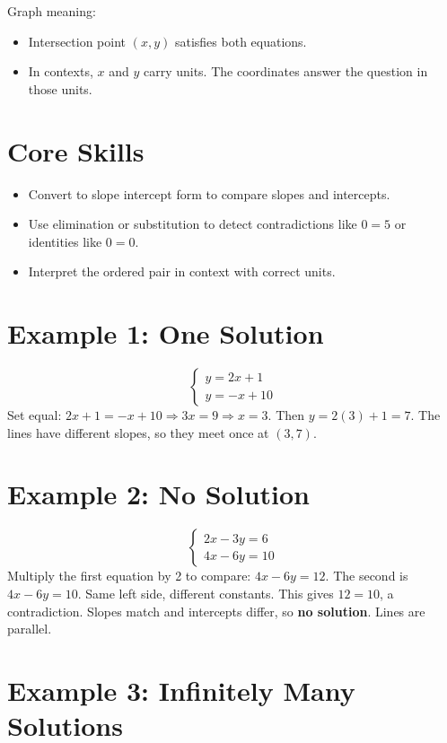 \documentclass[14pt]{extarticle}
\begin{document}
Graph meaning:
\begin{itemize}
    \item Intersection point \((x,y)\) satisfies both equations.
    \item In contexts, \(x\) and \(y\) carry units. The coordinates answer the question in those units.
\end{itemize}

\section*{Core Skills}
\begin{itemize}
    \item Convert to slope intercept form to compare slopes and intercepts.
    \item Use elimination or substitution to detect contradictions like \(0=5\) or identities like \(0=0\).
    \item Interpret the ordered pair in context with correct units.
\end{itemize}

\section*{Example 1: One Solution}

\[
\begin{cases}
y = 2x + 1\\
y = -x + 10
\end{cases}
\]
Set equal: \(2x + 1 = -x + 10 \Rightarrow 3x = 9 \Rightarrow x = 3\). Then \(y = 2(3) + 1 = 7\).  
The lines have different slopes, so they meet once at \(\boxed{(3,7)}\).

\section*{Example 2: No Solution}

\[
\begin{cases}
2x - 3y = 6\\
4x - 6y = 10
\end{cases}
\]
Multiply the first equation by 2 to compare: \(4x - 6y = 12\). The second is \(4x - 6y = 10\).  
Same left side, different constants. This gives \(12 = 10\), a contradiction.  
Slopes match and intercepts differ, so \textbf{no solution}. Lines are parallel.

\section*{Example 3: Infinitely Many Solutions}
\end{document}
